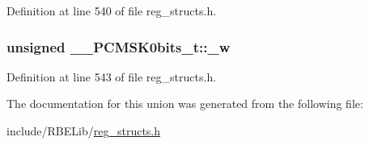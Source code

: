 Definition at line 540 of file reg\+\_\+structs.\+h.

\hypertarget{union_____p_c_m_s_k0bits__t_a482d4fc2bc2ecc15c1b80c513c699718}{
\subsubsection[{\+\_\+w}]{\setlength{\rightskip}{0pt plus 5cm}unsigned \+\_\+\+\_\+\+P\+C\+M\+S\+K0bits\+\_\+t\+::\+\_\+w}}\label{union_____p_c_m_s_k0bits__t_a482d4fc2bc2ecc15c1b80c513c699718}


Definition at line 543 of file reg\+\_\+structs.\+h.



The documentation for this union was generated from the following file\+:\begin{DoxyCompactItemize}
\item 
include/\+R\+B\+E\+Lib/\hyperlink{reg__structs_8h}{reg\+\_\+structs.\+h}\end{DoxyCompactItemize}
